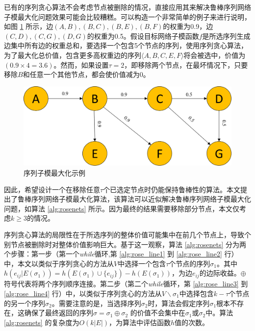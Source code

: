 已有的序列贪心算法\cite{mitrovic2018submodularity}不会考虑节点被删除的情况，直接应用其来解决鲁棒序列网络子模最大化问题效果可能会比较糟糕。可以构造一个非常简单的例子来进行说明，如图 \ref{fig:rose_sample} 所示，边$(A,B),(B,C),(B,E),(B,F)$的权重为0.9，边$(C,D),(C,G),(D,G)$的权重为0.5。假设目标网络子模函数\(f\)是所选序列生成边集中所有边的权重总和，要选择一个包含5个节点的序列，使用序列贪心算法，为了最大化总价值，包含更多高权重边的序列\(\langle A,B,C,E,F \rangle\)将会被选中，价值为\((0.9 \times 4 = 3.6)\)。然而，如果设置\(\tau=2\)，即移除两个节点，在最坏情况下，只要移除\(B\)和任意一个其他节点，都会使价值减为$0$。

\begin{figure}[th]
    \centering
    \includegraphics[width=.89\linewidth]{figure/rosenets/sample2}
    \caption{序列子模最大化示例}
    \label{fig:rose_sample}
\end{figure}

因此，希望设计一个在移除任意$\tau$个已选定节点时仍能保持鲁棒性的算法。本文提出了鲁棒序列网络子模最大化算法，该算法可以近似解决鲁棒序列网络子模最大化问题，如算法 \ref{alg:rosenets} 所示。因为最终的结果需要移除部分节点，本文仅考虑$k \ge 3$的情况。

序列贪心算法的局限性在于所选序列的整体价值可能集中在前几个节点上，导致个别节点被删除时对整体价值影响巨大。基于这一观察，算法 \ref{alg:rosenets} 分为两个步骤：第一步（第一个\textit{while}循环,第 \ref{alg:rose_line1} 到 \ref{alg:rose_line2} 行）中，本文以类似于序列贪心的方法从\(V\)中选择一个包含\(\tau\)个节点的序列\(\sigma_1\)。其中$h(e_{ij}|E(\sigma_1))=h(E(\sigma_1)\cup\{e_{ij}\})-h(E(\sigma_1))$，为边$e_{ij}$的边际收益。$\oplus$符号代表将两个序列顺序连接。第二步（第二个\textit{while}循环，第 \ref{alg:rose_line3} 到 \ref{alg:rose_line4} 行）中，以类似于序列贪心的方法从\(V\backslash \sigma_1\)中选择包含\(k-\tau\)个节点的另一个序列\(\sigma_2\)。需要注意的是，当选择序列\(\sigma_2\)时，算法会假定序列\(\sigma_1\)根本不存在，这确保了最终返回的序列\(\sigma = \sigma_1 \oplus \sigma_2\) 的价值不会集中在\(\sigma_1\)或\(\sigma_2\)中。算法 \ref{alg:rosenets} 的复杂度为\(O(k|E|)\)，为算法中评估函数$h$值的次数。

